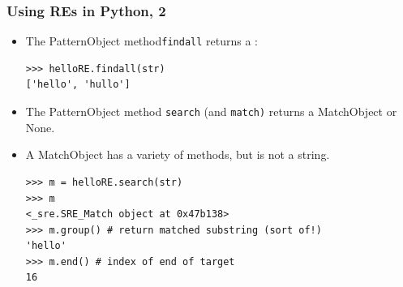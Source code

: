 \begin{frame}[fragile]
\frametitle{Using REs in Python, 2}

\begin{itemize}
\item The PatternObject method\texttt{findall} returns a :
\begin{verbatim}
>>> helloRE.findall(str)
['hello', 'hullo']
\end{verbatim}
\item  The PatternObject method \texttt{search} (and \texttt{match)} returns a MatchObject or None.
\item A MatchObject has a variety of methods, but is not a string.
\begin{verbatim}
>>> m = helloRE.search(str)
>>> m
<_sre.SRE_Match object at 0x47b138>
>>> m.group() # return matched substring (sort of!)
'hello'
>>> m.end() # index of end of target
16
\end{verbatim}

\end{itemize}
\end{frame}













